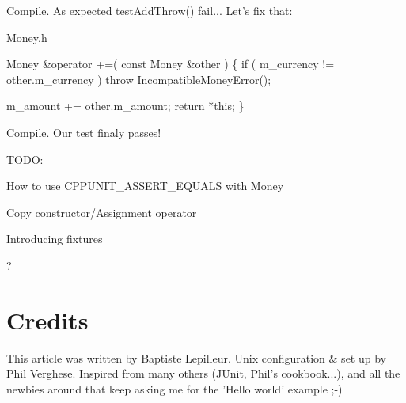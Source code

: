 Compile. As expected test\+Add\+Throw() fail... Let's fix that\+:

{\ttfamily Money.\+h} 
\begin{DoxyCode}
Money &operator +=( \textcolor{keyword}{const} Money &other )
\{
  \textcolor{keywordflow}{if} ( m\_currency != other.m\_currency )
    \textcolor{keywordflow}{throw} IncompatibleMoneyError();

  m\_amount += other.m\_amount;
  \textcolor{keywordflow}{return} *\textcolor{keyword}{this};
\}
\end{DoxyCode}


Compile. Our test finaly passes!

T\+O\+D\+O\+:
\begin{DoxyItemize}
\item How to use C\+P\+P\+U\+N\+I\+T\+\_\+\+A\+S\+S\+E\+R\+T\+\_\+\+E\+Q\+U\+A\+L\+S with Money
\item Copy constructor/\+Assignment operator
\item Introducing fixtures
\item ?
\end{DoxyItemize}\hypertarget{money_example_sec_credits}{}\section{Credits}\label{money_example_sec_credits}
This article was written by Baptiste Lepilleur. Unix configuration \& set up by Phil Verghese. Inspired from many others (J\+Unit, Phil's cookbook...), and all the newbies around that keep asking me for the 'Hello world' example ;-\/) 